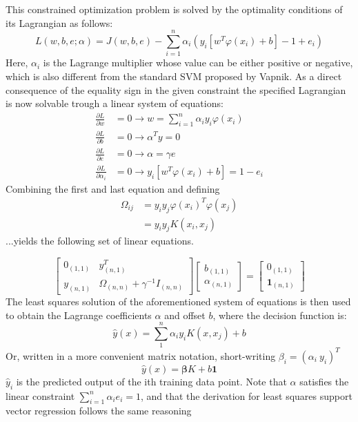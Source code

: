 \documentclass[preprint,12pt]{elsarticle}
\begin{document}
This constrained optimization problem is solved by the optimality conditions of its Lagrangian as follows:
\begin{equation}
L(w,b,e;\alpha) = J(w,b,e) - \sum_{i=1}^{n} \alpha_i(y_i [ w^T \varphi(x_i) + b]-1 + e_i)
\label{eq:lagrangian}
\end{equation}
Here, $\alpha_i$ is the Lagrange multiplier whose value can be either positive or negative, which is also different from the standard SVM proposed by Vapnik. 
As a direct consequence of the equality sign in the given constraint the specified Lagrangian is now solvable trough a linear system of equations:
\begin{align}
\frac{\partial L}{\partial w} &= 0 \rightarrow w = \sum_{i=1}^{n} \alpha_i y_i \varphi(x_i) \\
\frac{\partial L}{\partial b} &= 0 \rightarrow \alpha^T y = 0 \\
\frac{\partial L}{\partial e} &= 0 \rightarrow \alpha = \gamma e \\
\frac{\partial L}{\partial \alpha_i} &= 0 \rightarrow y_i [w^T \varphi(x_i) + b ] = 1 - e_i 	
\end{align}
Combining the first and last equation and defining 
\begin{align}
\Omega_{ij} &= y_i y_j \varphi(x_i)^T \varphi(x_j) \\
&= y_i y_j K(x_i, x_j)
\end{align}
...yields the following set of linear equations.

\begin{equation}
	\begin{bmatrix}
		0_{(1,1)} & y_{(n,1)}^T \\
		y_{(n,1)} & \Omega_{(n,n)} + \gamma^{-1} I_{(n,n)} 
		\end{bmatrix}	
		\begin{bmatrix}
		b_{(1,1)} \\
		\alpha_{(n,1)}
		\end{bmatrix}
		=
		\begin{bmatrix}
		0_{(1,1)} \\
		\mathbf{1}_{(n,1)}
	\end{bmatrix}	
\end{equation}
The least squares solution of the aforementioned system of equations is then used to  obtain the Lagrange coefficients $\alpha$ and offset $b$, where the decision function is:
\begin{equation}
	\hat{y}(x) = \sum_{1}^{n} \alpha_i y_i K(x, x_j) + b	
	\label{eq:classification}
\end{equation}
Or, written in a more convenient matrix notation, short-writing $\beta_i= (\alpha_i \  y_i)^T$
\begin{equation}
	\hat{y}(x) = \mathbf{\beta} K + b \mathbf{1}
	\label{eq:prediction}
\end{equation}
$\hat{y}_i$ is the predicted output of the ith training data point. Note that $\alpha$ satisfies the linear constraint $\sum_{i=1}^{n} \alpha_i  e_i = 1$, and that the derivation for least squares support vector regression follows the same reasoning %
\end{document}
